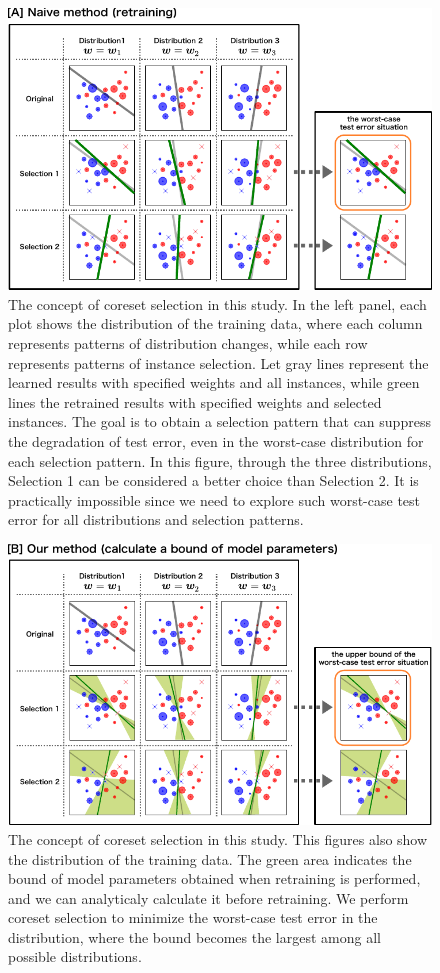 \begin{figure}[H]
	\centering
	\includegraphics[width=0.8\hsize]{fig/concept1.pdf}
	\caption{
	The concept of coreset selection in this study.
	In the left panel, each plot shows the distribution of the training data, where each column represents patterns of distribution changes, while each row represents patterns of instance selection.
	Let gray lines represent the learned results with specified weights and all instances, while green lines the retrained results with specified weights and selected instances.
	The goal is to obtain a selection pattern that can suppress the degradation of test error, even in the worst-case distribution for each selection pattern.
	In this figure, through the three distributions, Selection 1 can be considered a better choice than Selection 2.
	It is practically impossible since we need to explore such worst-case test error for all distributions and selection patterns.
	}
	\label{fig:concept1}
\end{figure}

\begin{figure}[H]
	\centering
	\includegraphics[width=0.8\hsize]{fig/concept2.pdf}
	\caption{
	The concept of coreset selection in this study.
	This figures also show the distribution of the training data.
	The green area indicates the bound of model parameters obtained when retraining is performed, and we can analyticaly calculate it before retraining.
	We perform coreset selection to minimize the worst-case test error in the distribution, where the bound becomes the largest among all possible distributions.
	}
	\label{fig:concept2}
\end{figure}

